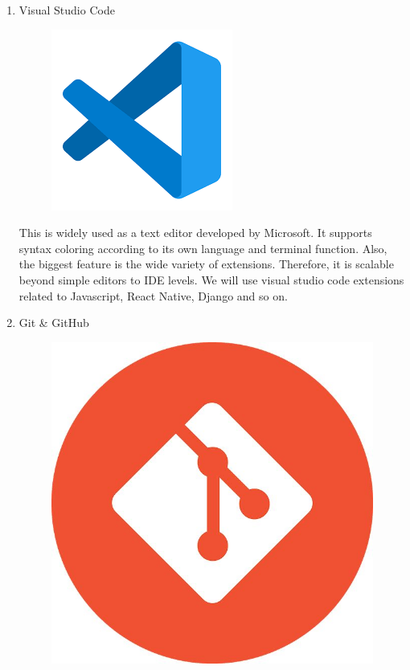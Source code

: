 \documentclass[conference]{IEEEtran}
\begin{document}
\begin{enumerate}
    \begin{enumerate}
        \item Visual Studio Code\\
        \begin{figure}[H]
                 \centering
                 \includegraphics[scale=0.3]{new_assets/vscode-logo.png}
                 \end{figure}
        This is widely used as a text editor developed by Microsoft. It supports syntax coloring according to its own language and terminal function. Also, the biggest feature is the wide variety of extensions. Therefore, it is scalable beyond simple editors to IDE levels. We will use visual studio code extensions related to Javascript, React Native, Django and so on.
        \item Git \& GitHub\\
        \begin{figure}[H]
                 \centering
                 \includegraphics[scale=0.1]{new_assets/git-logo.jpg}

\end{figure}
\end{enumerate}
\end{enumerate}
\end{document}
